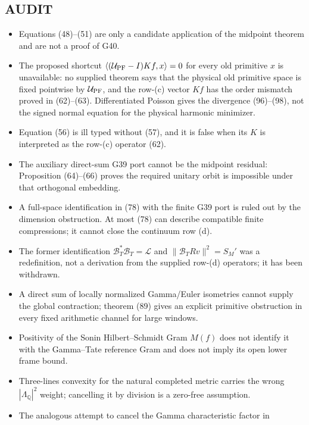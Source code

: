\documentclass[11pt]{article}
\newcommand{\cL}{\mathscr L}
\begin{document}
\subsection*{AUDIT}
\begin{itemize}
\item Equations (48)--(51) are only a candidate application of the midpoint
      theorem and are not a proof of G40.
\item The proposed shortcut
      $\langle(\mathcal U_{\rm PF}-I)Kf,x\rangle=0$ for every old primitive
      $x$ is unavailable: no supplied theorem says that the physical old
      primitive space is fixed pointwise by $\mathcal U_{\rm PF}$, and the
      row-(c) vector $Kf$ has the order mismatch proved in (62)--(63).
      Differentiated Poisson gives the divergence (96)--(98), not the signed
      normal equation for the physical harmonic minimizer.
\item Equation (56) is ill typed without (57), and it is false when its $K$ is
      interpreted as the row-(c) operator (62).
\item The auxiliary direct-sum G39 port cannot be the midpoint residual:
      Proposition (64)--(66) proves the required unitary orbit is impossible
      under that orthogonal embedding.
\item A full-space identification in (78) with the finite G39 port is ruled
      out by the dimension obstruction.  At most (78) can describe compatible
      finite compressions; it cannot close the continuum row (d).
\item The former identification
      $\mathcal B_T^*\mathcal B_T=\cL$ and
      $\|\mathcal B_TRv\|^2=S_M'$ was a redefinition, not a derivation from
      the supplied row-(d) operators; it has been withdrawn.
\item A direct sum of locally normalized Gamma/Euler isometries cannot supply
      the global contraction; theorem (89) gives an explicit primitive
      obstruction in every fixed arithmetic channel for large windows.
\item Positivity of the Sonin Hilbert--Schmidt Gram $M(f)$ does not identify
      it with the Gamma--Tate reference Gram and does not imply its open lower
      frame bound.
\item Three-lines convexity for the natural completed metric carries the
      wrong $|\Lambda_{\mathbb Q}|^2$ weight; cancelling it by division is a
      zero-free assumption.
\item The analogous attempt to cancel the Gamma characteristic factor in

\end{itemize}
\end{document}
